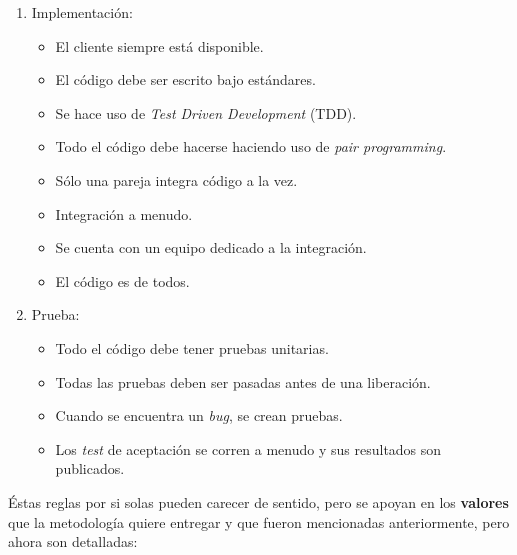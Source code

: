 \begin{enumerate}
\begin{itemize}
	\end{itemize}
\item Implementación:
	\begin{itemize}
	\item El cliente siempre está disponible. 
	\item El código debe ser escrito bajo estándares. 
	\item Se hace uso de \textit{Test Driven Development }(TDD).
	\item Todo el código debe hacerse haciendo uso de \textit{pair programming}.
	\item Sólo una pareja integra código a la vez.
	\item Integración a menudo.
	\item Se cuenta con un equipo dedicado a la integración.
	\item El código es de todos.
	\end{itemize}
\item Prueba:
	\begin{itemize}
	\item Todo el código debe tener pruebas unitarias.
	\item Todas las pruebas deben ser pasadas antes de una liberación.
	\item Cuando se encuentra un \textit{bug}, se crean pruebas.
	\item Los \textit{test} de aceptación se corren a menudo y sus resultados son publicados.
	\end{itemize}
\end{enumerate}

Éstas reglas por si solas pueden carecer de sentido, pero se apoyan en los \textbf{valores} que la metodología quiere entregar y que fueron mencionadas anteriormente, pero ahora son detalladas:

